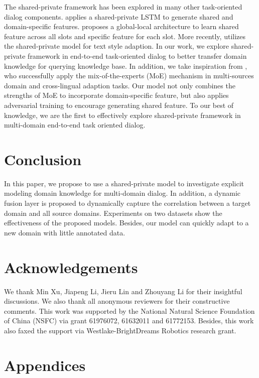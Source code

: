 \documentclass[11pt,a4paper]{article}
\begin{document}
The shared-private framework has been explored in many other task-oriented dialog components.
 applies a shared-private LSTM to generate shared and domain-specific features.
 proposes a global-local architecture to learn shared feature across all slots and specific feature for each slot.
More recently,
utilizes the shared-private model for text style adaption.
In our work, we explore shared-private framework in end-to-end task-oriented dialog to better transfer domain knowledge for querying knowledge base.
In addition, we take inspiration from , who successfully apply the mix-of-the-experts (MoE) mechanism in multi-sources domain and cross-lingual adaption tasks.
Our model not only combines the strengths of MoE to incorporate domain-specific feature, but also 
applies adversarial training to encourage generating shared feature.
To our best of knowledge, we are the first to effectively explore shared-private framework in multi-domain end-to-end task oriented dialog.
\section{Conclusion}
In this paper, we propose to use a shared-private model to investigate explicit modeling domain knowledge for multi-domain dialog.
In addition, a dynamic fusion layer is proposed to dynamically capture the correlation between a target domain and all source domains.
Experiments on two datasets show the effectiveness of the proposed models.
Besides, our model can quickly adapt to a new domain with little annotated data.

\section*{Acknowledgements}
We thank Min Xu, Jiapeng Li, Jieru Lin and Zhouyang Li for their insightful discussions.
We
also thank all anonymous reviewers for their constructive comments. 
This work was supported by the National Natural Science Foundation of China (NSFC) via grant 61976072, 61632011 and 61772153. Besides, this work also faxed the support via Westlake-BrightDreams Robotics research grant.




\appendix
\clearpage

\section{Appendices}
\label{sec:appendix}
\end{document}
